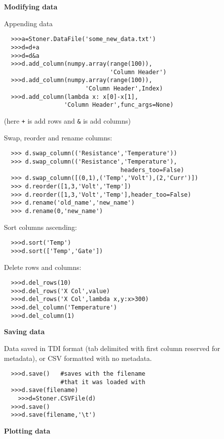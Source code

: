 \documentclass[a4paper,9pt,threecolumn,landscape]{scrartcl}
\begin{document}
\begin{multicols}{3}
{\vspace{0.5cm}
\textbf {Modifying data}
\vspace{0.2cm}\normalfont

Appending data
\begin{verbatim}
  >>>a=Stoner.DataFile('some_new_data.txt')
  >>>d=d+a
  >>>d=d&a
  >>>d.add_column(numpy.array(range(100)),
                              'Column Header')
  >>>d.add_column(numpy.array(range(100)),
                       'Column Header',Index)
  >>>d.add_column(lambda x: x[0]-x[1],
                 'Column Header',func_args=None)
\end{verbatim}
(here \verb:+: is add rows and \verb:&: is add columns)
\vspace{0.4cm}

Swap, reorder and rename columns:
\begin{verbatim}
  >>> d.swap_column(('Resistance','Temperature'))
  >>> d.swap_column(('Resistance','Temperature'),
                                 headers_too=False)
  >>> d.swap_column([(0,1),('Temp','Volt'),(2,'Curr')])
  >>> d.reorder([1,3,'Volt','Temp'])
  >>> d.reorder([1,3,'Volt','Temp'],header_too=False)
  >>> d.rename('old_name','new_name')
  >>> d.rename(0,'new_name')
\end{verbatim}

Sort columns ascending:
\begin{verbatim}
  >>>d.sort('Temp')
  >>>d.sort(['Temp','Gate'])
\end{verbatim}

Delete rows and columns:
\begin{verbatim}
  >>>d.del_rows(10)
  >>>d.del_rows('X Col',value)
  >>>d.del_rows('X Col',lambda x,y:x>300)
  >>>d.del_column('Temperature')
  >>>d.del_column(1)
\end{verbatim}

\vspace{0.5cm}
\textbf {Saving data}
\vspace{0.2cm}\normalfont

Data saved in TDI format (tab delimited with first column reserved for metadata), or CSV formatted with no metadata.
\begin{verbatim}
  >>>d.save()   #saves with the filename 
                #that it was loaded with
  >>>d.save(filename)
    >>>d=Stoner.CSVFile(d)
  >>>d.save()
  >>>d.save(filename,'\t')
\end{verbatim}

\vspace{0.5cm}
\textbf {Plotting data}
\vspace{0.2cm}\normalfont

}
\end{multicols}
\end{document}
